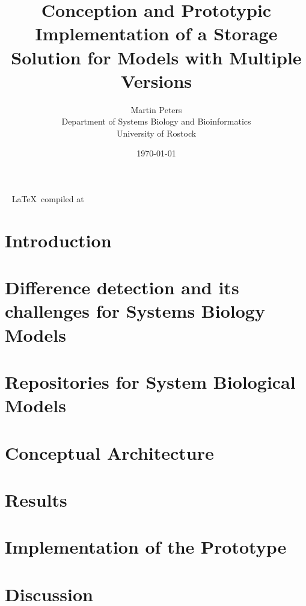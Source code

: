 \documentclass[12pt, a4paper, titlepage]{book}
\title{Conception and Prototypic Implementation of a Storage Solution for Models with Multiple Versions}
\author{Martin Peters\\[12pt]
	\small Department of Systems Biology and Bioinformatics\\
	\small University of Rostock}
\date{\today}
\begin{document}
	\maketitle
	\pagebreak
	~ \vfill
	{\hfill \tiny \LaTeX ~compiled at \DTMnow}
	\pagebreak
	\tableofcontents
	\listoffigures
	
	
	\chapter{Introduction}
	
	
	\chapter{Difference detection and its challenges for Systems Biology Models}
	
	
	\chapter{Repositories for System Biological Models}
	
	
	\chapter{Conceptual Architecture}
	
	
	\chapter{Results}
	
	
	\chapter{Implementation of the Prototype}
	
	
	\chapter{Discussion}
	
	
	
	
	
	\begin{appendices}
		\appendixpage
		\noappendicestocpagenum
		\addappheadtotoc
		
		
	\end{appendices}
\end{document}
